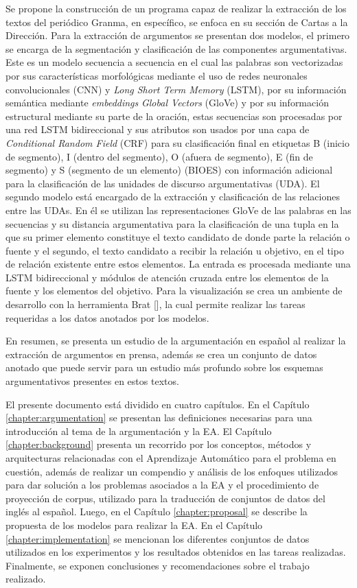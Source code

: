 Se propone la construcción de un programa capaz de realizar la extracción de los textos del periódico Granma, 
en específico, se enfoca en su sección de Cartas a la Dirección. Para la extracción
de argumentos se presentan dos modelos, el primero se encarga de la segmentación y clasificación
de las componentes argumentativas. Este es un modelo secuencia a secuencia en el cual las palabras 
son vectorizadas por sus características morfológicas mediante el uso de redes neuronales convolucionales
(CNN) y \emph{Long Short Term Memory} (LSTM), por su información
semántica mediante \emph{embeddings} \emph{Global Vectors} (GloVe) y por su información 
estructural mediante su parte de la oración, estas 
secuencias son procesadas por una red LSTM bidireccional y sus atributos son usados por una capa 
de \emph{Conditional Random Field} (CRF) 
para su clasificación final en etiquetas B (inicio de segmento), I (dentro del segmento), O (afuera de segmento), 
E (fin de segmento) y S (segmento de un elemento) (BIOES) con información adicional para la clasificación de las 
unidades de discurso argumentativas (UDA). El segundo modelo está encargado de la extracción y clasificación 
de las relaciones entre las UDAs. En él se utilizan las representaciones GloVe de las palabras en las secuencias 
y su distancia argumentativa para la clasificación de una tupla en la que su primer elemento 
constituye el texto candidato de donde parte la relación o fuente y el segundo, el texto candidato a recibir la 
relación u objetivo, en el tipo de relación existente entre estos elementos. La entrada es procesada mediante 
una LSTM bidireccional y módulos de atención cruzada entre los elementos de la fuente y los elementos del objetivo.
Para la visualización se crea un ambiente de desarrollo con la herramienta Brat [\cite{brat}], la cual permite realizar las 
tareas requeridas a los datos anotados por los modelos.

En resumen, se presenta un estudio de la argumentación en español al realizar la extracción de 
argumentos en prensa, además se crea un conjunto de datos anotado que puede servir
para un estudio más profundo sobre los esquemas argumentativos presentes en estos textos. 


El presente documento está dividido en cuatro capítulos.
En el Capítulo \ref{chapter:argumentation} se presentan las definiciones necesarias para una introducción
al tema de la argumentación y la EA.
El Capítulo \ref{chapter:background} presenta un recorrido por los 
conceptos, métodos y arquitecturas relacionadas con el Aprendizaje Automático para el problema 
en cuestión, además de realizar un compendio y análisis de los enfoques utilizados para dar solución
a los problemas asociados a la EA y el procedimiento de proyección de corpus, utilizado para la 
traducción de conjuntos de datos del inglés al español. 
Luego, en el Capítulo \ref{chapter:proposal}
se describe la propuesta de los modelos para realizar la EA.
En el Capítulo \ref{chapter:implementation} se mencionan los diferentes conjuntos de datos utilizados 
en los experimentos y los resultados obtenidos en las tareas realizadas.
Finalmente, se exponen conclusiones y recomendaciones sobre el trabajo 
realizado.
